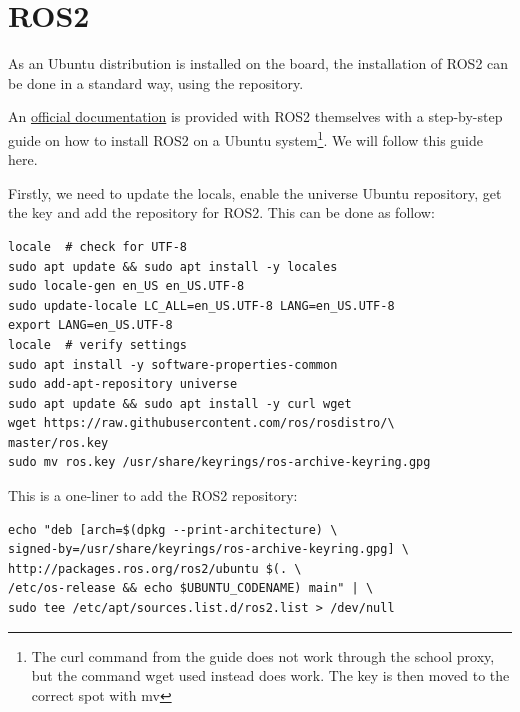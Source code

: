 \documentclass[10pt]{article}
\begin{document}


\pagebreak
\section{ROS2}
\label{sec:ros2}
As an Ubuntu distribution is installed on the board, the installation of ROS2
can be done in a standard way, using the repository.

An \href{https://docs.ros.org/en/humble/Installation/Ubuntu-Install-Debians.html}{official documentation}
is provided with ROS2 themselves with a step-by-step guide on how to install
ROS2 on a Ubuntu system\footnote{The curl command from the guide does not work through the school proxy,
  but the command wget used instead does work. The key is then moved to the correct spot with mv}.
We will follow this guide here.

Firstly, we need to update the locals, enable the universe Ubuntu repository,
get the key and add the repository for ROS2. This can be done as follow:

\begin{tcolorbox}
\begin{verbatim}
locale  # check for UTF-8
sudo apt update && sudo apt install -y locales
sudo locale-gen en_US en_US.UTF-8
sudo update-locale LC_ALL=en_US.UTF-8 LANG=en_US.UTF-8
export LANG=en_US.UTF-8
locale  # verify settings
sudo apt install -y software-properties-common
sudo add-apt-repository universe
sudo apt update && sudo apt install -y curl wget
wget https://raw.githubusercontent.com/ros/rosdistro/\
master/ros.key
sudo mv ros.key /usr/share/keyrings/ros-archive-keyring.gpg
\end{verbatim}
\end{tcolorbox}


This is a one-liner to add the ROS2 repository:

\begin{tcolorbox}
\begin{verbatim}
echo "deb [arch=$(dpkg --print-architecture) \
signed-by=/usr/share/keyrings/ros-archive-keyring.gpg] \
http://packages.ros.org/ros2/ubuntu $(. \
/etc/os-release && echo $UBUNTU_CODENAME) main" | \
sudo tee /etc/apt/sources.list.d/ros2.list > /dev/null

\end{verbatim}
\end{tcolorbox}
\end{document}
